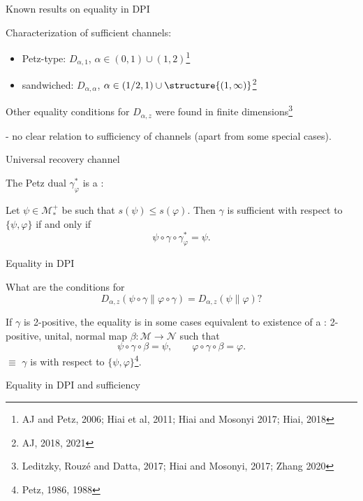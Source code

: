 \documentclass[mathserif]{beamer}
\newcommand{\<}{\langle}
\renewcommand{\>}{\rangle}
\newcommand{\Me}{\mathcal M}
\newcommand{\Ne}{\mathcal N}
\begin{document}
\begin{frame}{Known results on equality in DPI}

Characterization of sufficient channels:

\bigskip

\begin{itemize}
\item Petz-type: $D_{\alpha,1}$, $\alpha\in (0,1)\cup (1,2)$\footnote{AJ and Petz, 2006;
Hiai et al, 2011; 
Hiai and Mosonyi 2017; Hiai, 2018}


\medskip

\item sandwiched: $D_{\alpha,\alpha}$, $\alpha\in (1/2,1)\cup\structure{(1,\infty)}$\footnote{AJ,
2018, 2021}

\end{itemize}

\bigskip

Other equality conditions for $D_{\alpha,z}$ were found in finite dimensions\footnote{Leditzky, Rouz\'e and
Datta, 2017;  Hiai and Mosonyi, 2017; Zhang 2020}
\medskip

- no clear relation to sufficiency of channels (apart from some special cases).


\end{frame}



\begin{frame}{Universal recovery channel}


The Petz dual $\gamma_\varphi^*$ is a :


Let $\psi\in \Me_*^+$ be such that  $s(\psi)\le s(\varphi)$. Then  $\gamma$ is sufficient with respect to $\{\psi,\varphi\}$ if and only if 
\[
\psi\circ \gamma\circ \gamma_\varphi^*=\psi.
\]
\medskip 




\end{frame}






\begin{frame}{Equality in DPI}

What are the conditions for
\[
D_{\alpha,z}(\psi\circ\gamma\|\varphi\circ \gamma)=D_{\alpha,z}(\psi\|\varphi)?
\]

If $\gamma$ is 2-positive, the equality is \alert{in some cases} equivalent to existence of a
: 2-positive, unital, normal map $\beta:\Me\to \Ne$ such that
\[
\psi\circ \gamma\circ \beta=\psi,\qquad \varphi\circ \gamma\circ \beta=\varphi.
\]
$\equiv$  $\gamma$ is  with respect to
$\{\psi,\varphi\}$\footnote{Petz, 1986, 1988}.


\end{frame}


\begin{frame}{Equality in DPI and sufficiency}








\end{frame}
\end{document}
